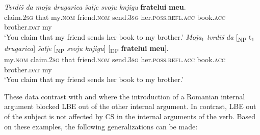 \documentclass[output=paper,
hidelinks,
newtxmath,
]{langscibook}
\begin{document}

\ea \label{ex30}
	\ea\label{ex30a}
    \gll \textit{Tvrdiš} \textit{da} \textit{moja} \textit{drugarica} \textit{šalje} \textit{svoju} \textit{knjigu} \textbf{fratelui} \textbf{meu}.\\          
         claim\textsc{.2sg} that my\textsc{.nom} friend\textsc{.nom} send\textsc{.3sg} her\textsc{.poss.refl.acc} book\textsc{.acc} brother\textsc{.dat} my\\
         \glt `You claim that my friend sends her book to my brother.'
	\ex\label{ex30b}
	 \gll \textit{Moja}$_1$ \textit{tvrdiš} \textit{da} [\textsubscript{NP} t$_1$ \textit{drugarica}] \textit{šalje}\hspace{3.5cm} [\textsubscript{NP} \textit{svoju} \textit{knjigu}] [\textsubscript{DP} \textbf{fratelui} \textbf{meu}].\\
         my\textsc{.nom} claim\textsc{.2sg} that {} {} friend\textsc{.nom} send\textsc{.3sg} {} her\textsc{.poss.refl.acc} book\textsc{.acc} {} brother\textsc{.dat} my\\ 
         \glt `You claim that my friend sends her book to my brother.'
	\z
\z

\noindent These data contrast with  and  where the introduction of a Romanian internal argument blocked LBE out of the other internal argument. In contrast, LBE out of the subject is not affected by CS in the internal arguments of the verb. Based on these examples, the following generalizations can be made:
\end{document}
